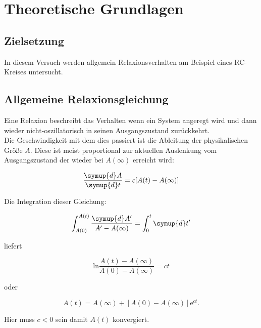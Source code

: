 \section{Theoretische Grundlagen}

    \subsection{Zielsetzung}

        \noindent In diesem Versuch werden allgemein Relaxionsverhalten am Beispiel 
        eines RC-Kreises untersucht.

    \subsection{Allgemeine Relaxionsgleichung}

        \noindent Eine Relaxion beschreibt das Verhalten wenn ein System angeregt wird und dann wieder nicht-oszillatorisch in seinen 
        Ausgangszustand zurückkehrt.\\ Die Geschwindigkeit mit dem dies passiert ist die Ableitung der physikalischen Größe $A$. Diese ist meist 
        proportional zur aktuellen Auslenkung vom Ausgangszustand der wieder bei $A(\infty)$ erreicht wird:

        \begin{equation}
            \frac{\symup{d}A}{\symup{d}t}=c[A(t)-A(\infty)]
            \label{eqn:1}
        \end{equation}

        \noindent Die Integration dieser Gleichung:

        \begin{equation*}
            \int_{A(0)}^{A(t)} \frac{\symup{d}A'}{A' - A(\infty)} = \int_0^t \symup{d}t'
        \end{equation*}

        \noindent liefert

        \begin{equation*}
            \text{ln} \frac{A(t) - A(\infty)}{A(0) - A(\infty)} = ct
        \end{equation*}

        \noindent oder

        \begin{equation}
            A(t) = A(\infty) + [A(0) - A(\infty)] \text{e}^{ct} . 
            \label{eqn:2}
        \end{equation}

        \noindent Hier muss $c < 0$ sein damit $A(t)$ konvergiert.

